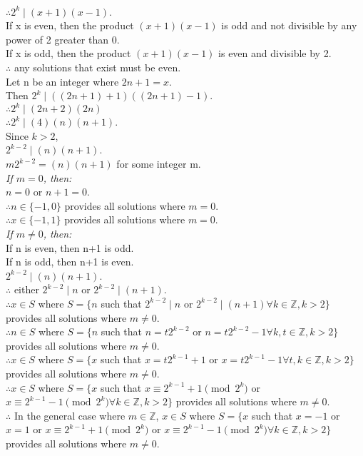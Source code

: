 \documentclass{article}
\begin{document}
\\$\therefore 2^k \mid (x + 1)(x - 1)$.
\\If x is even, then the product $(x + 1)(x - 1)$ is odd and not divisible by any power of 2 greater than 0.
\\If x is odd, then the product $(x + 1)(x - 1)$ is even and divisible by 2.
\\$\therefore$ any solutions that exist must be even.
\\Let n be an integer where $2n+1 = x$.
\\Then $2^k \mid ((2n+1) + 1)((2n+1) - 1)$.
\\$\therefore 2^k \mid (2n+2)(2n)$
\\$\therefore 2^k \mid (4)(n)(n+1)$.
\\Since $k>2$,
\\$2^{k-2} \mid (n)(n+1)$.
\\$m2^{k-2} = (n)(n+1)$ for some integer m.
\\\emph{If $m=0$, then:}
\\$n=0$ or $n+1=0$.
\\$\therefore n \in \{-1, 0\}$ provides all solutions where $m=0$.
\\$\therefore x \in \{-1, 1\}$ provides all solutions where $m=0$.
\\\emph{If $m \neq 0$, then:}
\\If n is even, then n+1 is odd. 
\\If n is odd, then n+1 is even. 
\\$2^{k-2} \mid (n)(n+1)$.
\\$\therefore$ either $2^{k-2} \mid n$ or $2^{k-2} \mid (n+1)$.
\\$\therefore x \in S$ where $S = \{n$ such that $2^{k-2} \mid n$ or $2^{k-2} \mid (n+1)$\;\;$\forall k \in \mathbb{Z}, k>2\}$ provides all solutions where $m \neq 0$.
\\$\therefore n \in S$ where $S = \{n$ such that $n = t2^{k-2}$ or $n = t2^{k-2} - 1$\;\;$\forall k,t \in \mathbb{Z}, k>2\}$ provides all solutions where $m \neq 0$.
\\$\therefore x \in S$ where $S = \{x$ such that $x = t2^{k-1}+1$ or $x = t2^{k-1}-1$\;\;$\forall t,k \in \mathbb{Z}, k>2\}$ provides all solutions where $m \neq 0$.
\\$\therefore x \in S$ where $S = \{x$ such that $x \equiv 2^{k-1}+1 \pmod{2^k}$ or $x \equiv 2^{k-1}-1 \pmod{2^k}$\;\;$\forall k \in \mathbb{Z}, k>2\}$ provides all solutions where $m \neq 0$.
\\$\therefore$ In the general case where $m \in \mathbb{Z}$, $x \in S$ where $S = \{x$ such that $x=-1$ or $x=1$ or $x \equiv 2^{k-1}+1 \pmod{2^k}$ or $x \equiv 2^{k-1}-1 \pmod{2^k}$\;\;$\forall k \in \mathbb{Z}, k>2\}$ provides all solutions where $m \neq 0$.
\end{document}
